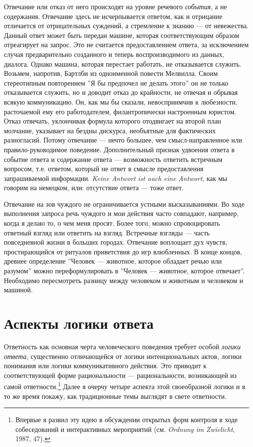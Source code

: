 \documentclass[12pt]{book}
\begin{document}
Отвечание или отказ от него происходят на уровне речевого \textit{события}, а не содержания. Отвечание здесь не исчерпывается ответом, как и отрицание отличается от отрицательных суждений, а стремление к знанию --- от невежества. Данный ответ может быть передан машине, которая соответствующим образом отреагирует на запрос. Это не считается предоставлением ответа, за исключением случая предварительно созданного и теперь воспроизводимого из данных, диалога. Однако машина, которая перестает работать, не отказывается служить. Возьмем, напротив, Бартлби из одноименной повести Мелвилла. Своим стереотипным повторением ''Я бы предпочел не делать этого'' он не только отказывается служить, но и доводит отказ до крайности, не отвечая и обрывая всякую коммуникацию. Он, как мы бы сказали, невосприимчив к любезности, расточаемой ему его работодателем, филантропически настроенным юристом. Отказ отвечать, уклончивая формула которого отодвигает на второй план молчание, указывает на бездны дискурса, необъятные для фактических разногласий. Потому отвечание --- нечто большее, чем смысл-направленное или правило-руководимое поведение. Дополнительный признак удвоения ответа в событие ответа и содержание ответа --- возможность ответить встречным вопросом, т.е. ответом, который не ответ в смысле предоставления запрашиваемой информации. \textit{Keine Antwort ist auch eine Antwort}, как мы говорим на немецком, или: отсутствие ответа --- тоже ответ.

Отвечание на зов чуждого не ограничивается устными высказываниями. Во ходе выполнения запроса речь чуждого и мои действия часто совпадают, например, когда я делаю то, о чем меня просят. Более того, можно спровоцировать ответный взгляд или ответить на взгляд. Встречные взгляды --- часть повседневной жизни в больших городах. Отвечание воплощает дух чувств, простирающийся от ритуалов приветствия до игр влюбленных. В конце концов, древнее определение ''Человек --- животное, которое обладает речью или разумом'' можно переформулировать в ''Человек --- животное, которое отвечает''. Необходимо пересмотреть разницу между человеком и животным и человеком и машиной.

\section{Аспекты логики ответа}

Ответность как основная черта человеческого поведения требует особой \textit{логики ответа}, существенно отличающейся от логики интенциональных актов, логики понимания или логики коммуникативного действия. Это приводит к соответствующей форме рациональности --- рациональности, возникающей из самой ответности.\footnote{Впервые я развил эту идею в обсуждении открытых форм контроля в ходе собеседований и интерактивных мероприятий (см. \textit{Ordnung im Zwielicht}, 1987, 47).} Далее я очерчу четыре аспекта этой своеобразной логики и в то же время покажу, как традиционные темы выглядят в свете ответности.
\end{document}
